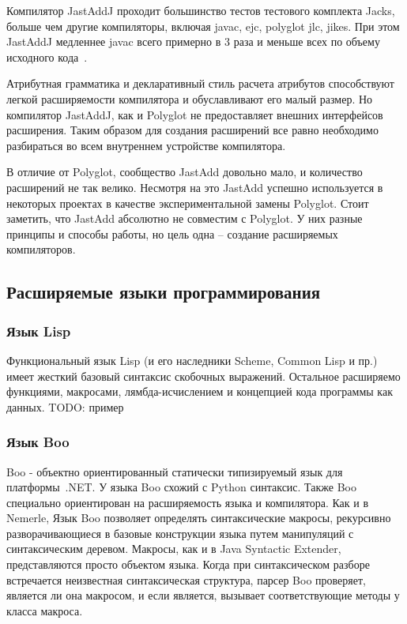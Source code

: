 \documentclass[a4paper,12pt]{article}
\begin{document}
Компилятор JastAddJ проходит большинство тестов тестового комплекта Jacks,
больше чем другие компиляторы, включая javac, ejc, polyglot jlc, jikes. При
этом JastAddJ медленнее javac всего примерно в 3 раза и меньше всех по объему
исходного кода~\cite{JastAddJ}.

Атрибутная грамматика и декларативный стиль расчета атрибутов способствуют
легкой расширяемости компилятора и обуславливают его малый размер. Но
компилятор JastAddJ, как и Polyglot не предоставляет внешних интерфейсов
расширения. Таким образом для создания расширений все равно необходимо
разбираться во всем внутреннем устройстве компилятора.

В отличие от Polyglot, сообщество JastAdd довольно мало, и количество
расширений не так велико. Несмотря на это JastAdd успешно используется в
некоторых проектах в качестве экспериментальной замены Polyglot. Стоит
заметить, что JastAdd абсолютно не совместим с Polyglot. У них разные принципы
и способы работы, но цель одна -- создание расширяемых компиляторов.

\subsection{Расширяемые языки программирования}

\subsubsection*{Язык Lisp}
\label{lisp}
Функциональный язык Lisp (и его наследники Scheme, Common Lisp и пр.) имеет
жесткий базовый синтаксис скобочных выражений. Остальное расширяемо функциями,
макросами, лямбда-исчислением и концепцией кода программы как данных.
TODO: пример

\subsubsection*{Язык Boo}
Boo - объектно ориентированный статически типизируемый язык для платформы~.NET.
У языка Boo схожий с Python синтаксис. Также Boo специально ориентирован на
расширяемость языка и компилятора. Как и в Nemerle, Язык Boo позволяет
определять синтаксические макросы, рекурсивно разворачивающиеся в базовые
конструкции языка путем манипуляций с синтаксическим деревом. Макросы, как и в
Java Syntactic Extender, представляются просто объектом языка. Когда при
синтаксическом разборе встречается неизвестная синтаксическая структура, парсер
Boo проверяет, является ли она макросом, и если является, вызывает
соответствующие методы у класса макроса.
\end{document}
